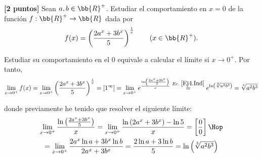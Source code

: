 \documentclass[12pt]{article}
\begin{document}
\begin{ejercicio}\textbf{[2 puntos]} Sean $a,b\in \bb{R}^+$. Estudiar el comportamiento en $x=0$ de la función $f:\bb{R}^+ \to \bb{R}$ dada por
\begin{equation*}
    f(x)=\left(\frac{2a^x + 3b^x}{5}\right)^{\frac{1}{x}} \qquad (x\in \bb{R}^+).
\end{equation*}

    Estudiar su comportamiento en el 0 equivale a calcular el límite si $x\to 0^+$. Por tanto,
    \begin{equation*}
        \lim_{x\to 0^+}f(x) = \lim_{x\to 0^+} \left(\frac{2a^x + 3b^x}{5}\right)^{\frac{1}{x}} = [1^\infty] = \lim_{x\to 0^+} e^{\frac{\ln\left(\frac{2a^x + 3b^x}{5}\right)}{x}} \stackrel{Ec.\;\ref{Ej4.Ind}}{=}e^{\ln \left(\sqrt[5]{a^2b^3}\right)} = \sqrt[5]{a^2b^3}
    \end{equation*}

    donde previamente he tenido que resolver el siguiente límite:
    \begin{multline}\label{Ej4.Ind}
        \lim_{x\to 0^+}  \frac{\ln\left(\frac{2a^x + 3b^x}{5}\right)}{x}
        = \lim_{x\to 0^+}  \frac{\ln\left(2a^x + 3b^x\right)-\ln 5}{x}
        = \left[\frac{0}{0}\right] \Hop\\=
        \lim_{x\to 0^+} \frac{2a^x\ln a + 3b^x \ln b}{2a^x+3b^x} = \frac{2\ln a + 3\ln b}{5} = \ln \left(\sqrt[5]{a^2b^3}\right)
    \end{multline}
\end{ejercicio}
\end{document}
